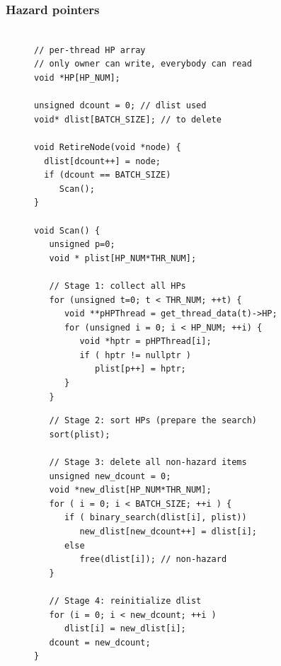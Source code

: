 \documentclass[aspectratio=169, pdf, 8pt, unicode]{beamer}
\begin{document}
\begin{frame}[fragile]
\frametitle{Hazard pointers}
\begin{figure}[H]
\centering
\begin{minipage}{0.45\textwidth}
\small
\begin{verbatim}

// per-thread HP array
// only owner can write, everybody can read
void *HP[HP_NUM]; 

unsigned dcount = 0; // dlist used
void* dlist[BATCH_SIZE]; // to delete

void RetireNode(void *node) { 
  dlist[dcount++] = node;
  if (dcount == BATCH_SIZE)
     Scan();
}

void Scan() { 
   unsigned p=0;
   void * plist[HP_NUM*THR_NUM];

   // Stage 1: collect all HPs
   for (unsigned t=0; t < THR_NUM; ++t) {
      void **pHPThread = get_thread_data(t)->HP;
      for (unsigned i = 0; i < HP_NUM; ++i) {
         void *hptr = pHPThread[i];
         if ( hptr != nullptr )
            plist[p++] = hptr;
      }
   }

\end{verbatim}
\end{minipage}%
\hspace{0.5mm}
\begin{minipage}{0.45\textwidth}
\small
\begin{verbatim}
   // Stage 2: sort HPs (prepare the search)
   sort(plist);

   // Stage 3: delete all non-hazard items
   unsigned new_dcount = 0;
   void *new_dlist[HP_NUM*THR_NUM];
   for ( i = 0; i < BATCH_SIZE; ++i ) {
      if ( binary_search(dlist[i], plist))
         new_dlist[new_dcount++] = dlist[i];
      else
         free(dlist[i]); // non-hazard
   }

   // Stage 4: reinitialize dlist
   for (i = 0; i < new_dcount; ++i ) 
      dlist[i] = new_dlist[i]; 
   dcount = new_dcount;
}
\end{verbatim}
\end{minipage}%
\end{figure}
\end{frame}
\end{document}

